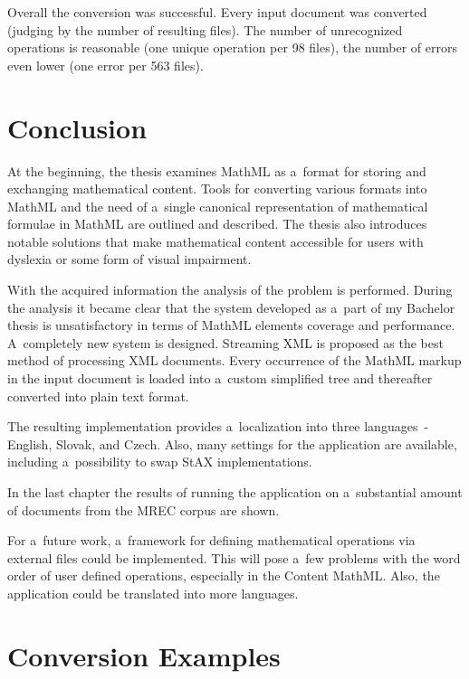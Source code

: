 \documentclass[11pt,oneside,final]{fithesis2}
\begin{document}
Overall the conversion was successful. Every input document was converted (judging by the number of resulting files). The number of unrecognized operations is reasonable (one unique operation per 98 files), the number of errors even lower (one error per 563 files).

\chapter{Conclusion}
At the beginning, the thesis examines MathML as a~format for storing and exchanging mathematical content. Tools for converting various formats into MathML and the need of a~single canonical representation of mathematical formulae in MathML are outlined and described. The thesis also introduces notable solutions that make mathematical content accessible for users with dyslexia or some form of visual impairment. 

With the acquired information the analysis of the problem is performed. During the analysis it became clear that the system developed as a~part of my Bachelor thesis is unsatisfactory in terms of MathML elements coverage and performance. A~completely new system is designed. Streaming XML is proposed as the best method of processing XML documents. Every occurrence of the MathML markup in the input document is loaded into a~custom simplified tree and thereafter converted into plain text format. 

The resulting implementation provides a~localization into three languages~- English, Slovak, and Czech. Also, many settings for the application are available, including a~possibility to swap StAX implementations.  

In the last chapter the results of running the application on a~substantial amount of documents from the MREC corpus are shown. 

For a~future work, a~framework for defining mathematical operations via external files could be implemented. This will pose a~few problems with the word order of user defined operations, especially in the Content MathML. Also, the application could be translated into more languages. 

\clearpage
{}



\appendix
\chapter{Conversion Examples}
\label{appendix:conversionexamples}
\end{document}
